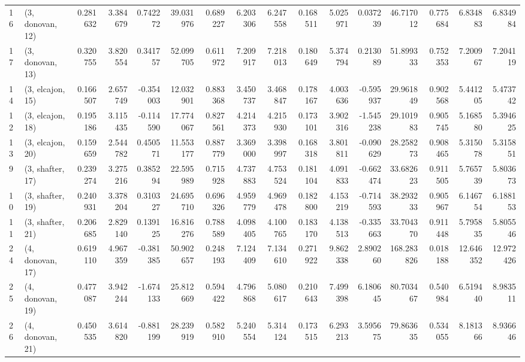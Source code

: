 \begin{tabular}{llrrrrrrrrrrrrrr}
16 &  (3, donovan, 12) &   0.281632 &  3.384679 &  0.742272 &  39.031976 &  0.689227 &   6.203306 &  6.247558 &  0.168511 &  5.025971 &  0.037239 &   46.717012 &  0.775684 &   6.834883 &   6.834984 \\
17 &  (3, donovan, 13) &   0.320755 &  3.820554 &  0.341757 &  52.099705 &  0.611972 &   7.209917 &  7.218013 &  0.180649 &  5.374794 &  0.213089 &   51.899333 &  0.752353 &   7.200967 &   7.204119 \\
14 &  (3, elcajon, 15) &   0.166507 &  2.657749 & -0.354003 &  12.032901 &  0.883368 &   3.450737 &  3.468847 &  0.178167 &  4.003636 & -0.595937 &   29.961849 &  0.902568 &   5.441205 &   5.473742 \\
12 &  (3, elcajon, 18) &   0.195186 &  3.115435 & -0.114590 &  17.774067 &  0.827561 &   4.214373 &  4.215930 &  0.173101 &  3.902316 & -1.545238 &   29.101983 &  0.905745 &   5.168580 &   5.394625 \\
13 &  (3, elcajon, 20) &   0.159659 &  2.544782 &  0.450571 &  11.553177 &  0.887779 &   3.369000 &  3.398997 &  0.168318 &  3.801811 & -0.090629 &   28.258273 &  0.908465 &   5.315078 &   5.315851 \\
9  &  (3, shafter, 17) &   0.239274 &  3.275216 &  0.385294 &  22.595989 &  0.715928 &   4.737883 &  4.753524 &  0.181104 &  4.091833 & -0.662474 &   33.682623 &  0.911505 &   5.765739 &   5.803673 \\
10 &  (3, shafter, 19) &   0.240931 &  3.378204 &  0.310327 &  24.695710 &  0.696326 &   4.959779 &  4.969478 &  0.182800 &  4.153219 & -0.714593 &   38.293233 &  0.905967 &   6.146754 &   6.188153 \\
11 &  (3, shafter, 21) &   0.206685 &  2.829140 &  0.139125 &  16.816276 &  0.788589 &   4.098405 &  4.100765 &  0.183170 &  4.138513 & -0.335663 &   33.704370 &  0.911448 &   5.795835 &   5.805546 \\
24 &  (4, donovan, 17) &   0.619110 &  4.967359 & -0.381385 &  50.902657 &  0.248193 &   7.124409 &  7.134610 &  0.271922 &  9.862338 &  2.890260 &  168.283826 &  0.018188 &  12.646352 &  12.972426 \\
25 &  (4, donovan, 19) &   0.477087 &  3.942244 & -1.674133 &  25.812669 &  0.594422 &   4.796868 &  5.080617 &  0.210643 &  7.499398 &  6.180645 &   80.703467 &  0.540984 &   6.519440 &   8.983511 \\
26 &  (4, donovan, 21) &   0.450535 &  3.614820 & -0.881199 &  28.239919 &  0.582910 &   5.240554 &  5.314124 &  0.173515 &  6.293213 &  3.595675 &   79.863635 &  0.534055 &   8.181366 &   8.936646 \\

\end{tabular}
